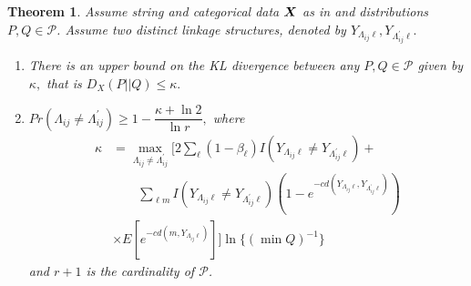 \documentclass[portrait,a0,final]{a0poster}
\newtheorem{theorem}{Theorem}
\newenvironment{poster}{
  \begin{center}
  \begin{minipage}[c]{0.98\textwidth}
}{
  \end{minipage}
  \end{center}
}
\begin{document}
\begin{poster}
\begin{multicols}{3}
\begin{theorem}
\label{theorem:string}
Assume string and categorical data $\bm{X}$ as in \cite{steorts15entity} and distributions $P,Q \in \mathcal{P}$.  Assume two distinct linkage structures, denoted by $Y_{\Lambda_{ij}\ell}, Y_{\Lambda^\prime_{ij}\ell}.$
\begin{enumerate}
\item [i)] There is an upper bound on the KL divergence between any $P,Q \in \mathcal{P}$ 
given by $\kappa,$ that is $D_X(P||Q) \leq \kappa.$
\item [ii)] $Pr(\Lambda_{ij} \neq \Lambda^\prime_{ij}) \geq 1- \dfrac{\kappa + \ln 2}{\ln r},$
where 
\begin{align*}
\kappa &= \max_{\Lambda_{ij} \neq \Lambda^\prime_{ij}}\bigg[
2 \sum_{\ell} (1-\beta_\ell) I(Y_{\Lambda_{ij}\ell} \neq Y_{\Lambda^\prime_{ij}\ell}) 
  +  \\
& \qquad \sum_{\ell m}  I(Y_{\Lambda_{ij}\ell} \neq Y_{\Lambda^\prime_{ij}\ell}) 
 \left(
1 - e^{-c d(Y_{\Lambda_{ij}\ell}, Y_{\Lambda^\prime_{ij}\ell})}
\right) \\
&\times E[ e^{-c  d(m, Y_{\Lambda_{ij}\ell})} ] \bigg]\ln\{ (\min Q)^{-1} \}
\end{align*}
and $r+1$ is the cardinality of $\mathcal{P}$.
\end{enumerate}
\end{theorem}


\end{multicols}
\end{poster}
\end{document}
